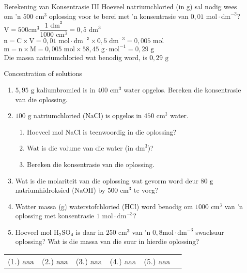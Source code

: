       \begin{wex}{Berekening van Konsentrasie III }
{
\label{m38712*id283476}Hoeveel natriumchloried (in g) sal nodig wees om 'n $500 {\text{ cm}}^{3}$ oplossing voor te berei met 'n konsentrasie van $0,01 \text{ mol} \cdot \text{dm}^{-3}$?
   }
{
$\text{V}= 500 \text{cm}^{3} \dfrac{1 \text{ dm}^{3}}{1 000 \text{ cm}^{3}}=0,5 {\text{ dm}}^{3}$
$\text{n}=\text{C} \times \text{V}= 0,01 \text{ mol} \cdot \text{dm}^{-3} \times 0,5 \text{ dm}^{-3} = 0,005 \text{ mol}$
$\text{m}=\text{n} \times \text{M}= 0,005 \text{ mol} \times 58,45 \text{ g} \cdot \text{mol}^{-1} = 0,29 \text{ g}$\\
Die massa natriumchloried wat benodig word, is $0,29 \text{ g}$ 
}
    \end{wex}
    \noindent
\label{m38712*secfhsst!!!underscore!!!id1879}
            \begin{exercises}{ Concentration of solutions
      }
            \nopagebreak \noindent
      \label{m38712*id283713}\begin{enumerate}[noitemsep, label=\textbf{\arabic*}. ] 
\item $5,95 \text{ g}$ kaliumbromied is in $400 {\text{ cm}}^{3}$ water opgelos. Bereken die konsentrasie van die oplossing.
\item $100 \text{ g}$ natriumchloried ($\text{NaCl}$) is opgelos in $450 {\text{ cm}}^{3}$ water.
  \begin{enumerate}[noitemsep, label=\textbf{\alph*}. ] 
    \item Hoeveel mol NaCl is teenwoordig in die oplossing?
    \item Wat is die volume van die water (in ${\text{dm}}^{3}$)?
    \item Bereken die konsentrasie van die oplossing.
\end{enumerate}
\item Wat is die molariteit van die oplossing wat gevorm word deur $80 \text{ g}$ natriumhidroksied ($\text{NaOH}$) by $500 {\text{ cm}}^{3}$ te voeg? 
\item Watter massa (g) waterstofchloried ($\text{HCl}$) word benodig om $1000 {\text{ cm}}^{3}$ van 'n oplossing met konsentrasie $1 \text{ mol} \cdot {\text{dm}}^{-3}$?
\item Hoeveel mol $\text{H}{}_{2}\text{SO}{}_{4}$ is daar in $250 {\text{ cm}}^{3}$ van 'n $0,8 \text{mol} \cdot \text{dm}^{-3}$ swaelsuur oplossing? Wat is die massa van die suur in hierdie oplossing?
\end{enumerate}
\practiceinfo
\par 
 \par \begin{tabular}[h]{cccccc}
 (1.) aaa  &  (2.) aaa  &  (3.) aaa  &  (4.) aaa  &  (5.) aaa  & \end{tabular}
\end{exercises}
